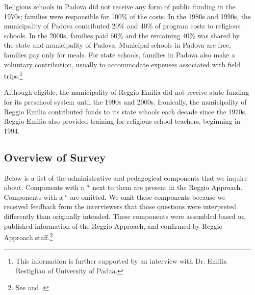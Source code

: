 Religious schools in Padova did not receive any form of public funding in the 1970s; families were responsible for 100\% of the costs. In the 1980s and 1990s, the municipality of Padova contributed 20\% and 40\% of program costs to religious schools. In the 2000s, families paid 60\% and the remaining 40\% was shared by the state and municipality of Padova. Municipal schools in Padova are free, families pay only for meals. For state schools, families in Padova also make a voluntary contribution, usually to accommodate expenses associated with field trips.\footnote{This information is further supported by an interview with Dr. Emilia Restiglian of University of Padua.}  
 
Although eligible, the municipality of Reggio Emilia did not receive state funding for its preschool system until the 1990s and 2000s. Ironically, the municipality of Reggio Emilia contributed funds to its state schools each decade since the 1970s. Reggio Emilia also provided training for religious school teachers, beginning in 1994.  

\subsection{Overview of Survey}
Below is a list of the administrative and pedagogical components that we inquire about. Components with a * next to them are present in the Reggio Approach. Components with a $^o$ are omitted. We omit these components because we received feedback from the interviewers that those questions were interpreted differently than originally intended. These components were assembled based on published information of the Reggio Approach, and confirmed by Reggio Approach staff.\footnote{See \citet{Edwards-etal-eds_1998_Hundred-Languages} and \citet{OECD_2001_Italy-Country-Note}.}

